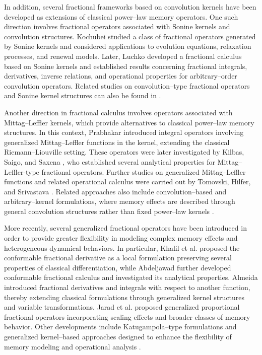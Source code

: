\documentclass[11pt]{article}
\numberwithin{equation}{section}
\begin{document}
In addition, several fractional frameworks based on convolution kernels have been developed as extensions of classical power--law memory operators. One such direction involves fractional operators associated with Sonine kernels and convolution structures. Kochubei \cite{Kochubei2011} studied a class of fractional operators generated by Sonine kernels and considered applications to evolution equations, relaxation processes, and renewal models. Later, Luchko \cite{Luchko2021} developed a fractional calculus based on Sonine kernels and established results concerning fractional integrals, derivatives, inverse relations, and operational properties for arbitrary--order convolution operators. Related studies on convolution--type fractional operators and Sonine kernel structures can also be found in \cite{LuchkoYamamoto2017,Tarasov2019}.

Another direction in fractional calculus involves operators associated with Mittag--Leffler kernels, which provide alternatives to classical power--law memory structures. In this context, Prabhakar \cite{Prabhakar1971} introduced integral operators involving generalized Mittag--Leffler functions in the kernel, extending the classical Riemann--Liouville setting. These operators were later investigated by Kilbas, Saigo, and Saxena \cite{KilbasSaigoSaxena2004}, who established several analytical properties for Mittag--Leffler-type fractional operators. Further studies on generalized Mittag--Leffler functions and related operational calculus were carried out by Tomovski, Hilfer, and Srivastava \cite{Tomovski2010}. Related approaches also include convolution--based and arbitrary--kernel formulations, where memory effects are described through general convolution structures rather than fixed power--law kernels \cite{LorenzoHartley2000,Samko1993}.

More recently, several generalized fractional operators have been introduced in order to provide greater flexibility in modeling complex memory effects and heterogeneous dynamical behaviors. In particular, Khalil et al. \cite{Khalil2014} proposed the conformable fractional derivative as a local formulation preserving several properties of classical differentiation, while Abdeljawad \cite{Abdeljawad2015} further developed conformable fractional calculus and investigated its analytical properties. Almeida \cite{Almeida2017} introduced fractional derivatives and integrals with respect to another function, thereby extending classical formulations through generalized kernel structures and variable transformations. Jarad et al. \cite{JaradAbdeljawadAlzabut2017} proposed generalized proportional fractional operators incorporating scaling effects and broader classes of memory behavior. Other developments include Katugampola--type formulations and generalized kernel--based approaches designed to enhance the flexibility of memory modeling and operational analysis \cite{Katugampola2014,OrtigueiraMachado2015}.
\end{document}
